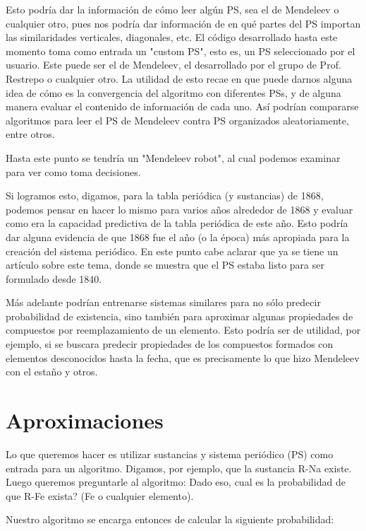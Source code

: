 \documentclass[twoside,twocolumn]{article}
\begin{document}
Esto podr\'ia dar la informaci\'on de c\'omo leer alg\'un PS, sea el de Mendeleev o cualquier otro, pues nos podr\'ia dar informaci\'on de en qu\'e partes del PS importan las similaridades verticales, diagonales, etc. 
El c\'odigo desarrollado hasta este momento toma como entrada un "custom PS", esto es, un PS seleccionado por el usuario. Este puede ser el de Mendeleev, el desarrollado por el grupo de Prof. Restrepo o cualquier otro. La utilidad de esto recae en que puede darnos alguna idea de c\'omo es la convergencia del algoritmo con diferentes PSs, y de alguna manera evaluar el contenido de informaci\'on de cada uno. As\'i podr\'ian compararse algoritmos para leer el PS de Mendeleev contra PS organizados aleatoriamente, entre otros.

Hasta este punto se tendr\'ia un "Mendeleev robot", al cual podemos examinar para ver como toma decisiones.

Si logramos esto, digamos, para la tabla peri\'odica (y sustancias) de 1868, podemos pensar en hacer lo mismo para varios a\~nos alrededor de 1868 y evaluar como era la capacidad predictiva de la tabla peri\'odica de este a\~no. Esto podr\'ia dar alguna evidencia de que 1868 fue el a\~no (o la \'epoca) m\'as apropiada para la creaci\'on del sistema peri\'odico. En este punto cabe aclarar que ya se tiene un art\'iculo sobre este tema, donde se muestra que el PS estaba listo para ser formulado desde 1840.

M\'as adelante podr\'ian entrenarse sistemas similares para no s\'olo predecir probabilidad de existencia, sino tambi\'en para aproximar algunas propiedades de compuestos por reemplazamiento de un elemento. Esto podr\'ia ser de utilidad, por ejemplo, si se buscara predecir propiedades de los compuestos formados con elementos desconocidos hasta la fecha, que es precisamente lo que hizo Mendeleev con el esta\~no y otros. 

\section{Aproximaciones}
\label{sec:aproximaciones}

Lo que queremos hacer es utilizar sustancias y sistema peri\'odico (PS) como entrada para un algoritmo. Digamos, por ejemplo, que la sustancia R-Na existe. Luego queremos preguntarle al algoritmo: Dado eso, cual es la probabilidad de que R-Fe exista? (Fe o cualquier elemento).

Nuestro algoritmo se encarga entonces de calcular la siguiente probabilidad:
\end{document}
